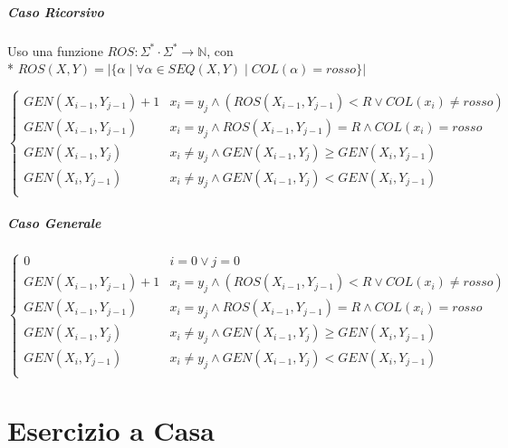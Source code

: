 \paragraph{Caso Ricorsivo}
Uso una funzione $ROS : \Sigma^* \cdot \Sigma^* \rightarrow \mathbb{N}$, con \\*
$ROS(X, Y) = |\{ \alpha \mid \forall \alpha \in SEQ(X, Y) \mid COL(\alpha) = rosso\}|$

\[
    \begin{cases}
        \text{$GEN(X_{i-1}, Y_{j-1}) + 1$} & \text{$x_i = y_j \land (ROS(X_{i-1}, Y_{j-1}) < R \lor COL(x_i) \ne rosso)$} \\
        \text{$GEN(X_{i-1}, Y_{j-1})$} & \text{$x_i = y_j \land ROS(X_{i-1}, Y_{j-1}) = R \land COL(x_i) = rosso$} \\
        \text{$GEN(X_{i-1}, Y_j)$} & \text{$x_i \ne y_j \land GEN(X_{i-1}, Y_j) \geq GEN(X_i, Y_{j-1})$} \\
        \text{$GEN(X_i, Y_{j-1})$} & \text{$x_i \ne y_j \land GEN(X_{i-1}, Y_j) < GEN(X_i, Y_{j-1})$} \\
    \end{cases}
\]

\paragraph{Caso Generale}

\[
    \begin{cases}
        \text{$0$} & \text{$i = 0 \lor j = 0$} \\
        \text{$GEN(X_{i-1}, Y_{j-1}) + 1$} & \text{$x_i = y_j \land (ROS(X_{i-1}, Y_{j-1}) < R \lor COL(x_i) \ne rosso)$} \\
        \text{$GEN(X_{i-1}, Y_{j-1})$} & \text{$x_i = y_j \land ROS(X_{i-1}, Y_{j-1}) = R \land COL(x_i) = rosso$} \\
        \text{$GEN(X_{i-1}, Y_j)$} & \text{$x_i \ne y_j \land GEN(X_{i-1}, Y_j) \geq GEN(X_i, Y_{j-1})$} \\
        \text{$GEN(X_i, Y_{j-1})$} & \text{$x_i \ne y_j \land GEN(X_{i-1}, Y_j) < GEN(X_i, Y_{j-1})$} \\
    \end{cases}
\]

\chapter{Esercizio a Casa}


